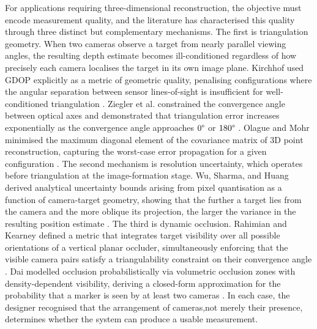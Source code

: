 For applications requiring three-dimensional reconstruction, the objective must encode measurement quality, and the literature has characterised this quality through three distinct but complementary mechanisms. The first is triangulation geometry. When two cameras observe a target from nearly parallel viewing angles, the resulting depth estimate becomes ill-conditioned regardless of how precisely each camera localises the target in its own image plane. Kirchhof used \gls{GDOP} explicitly as a metric of geometric quality, penalising configurations where the angular separation between sensor lines-of-sight is insufficient for well-conditioned triangulation \parencite{kirchhofOptimalPlacementMultiple2013}. Ziegler et al. constrained the convergence angle between optical axes and demonstrated that triangulation error increases exponentially as the convergence angle approaches $0\degree$ or $180\degree$ \parencite{zieglerOptimalCameraPlacement2023}. Olague and Mohr minimised the maximum diagonal element of the covariance matrix of 3D point reconstruction, capturing the worst-case error propagation for a given configuration \parencite{olagueOptimalCameraPlacement2002}. The second mechanism is resolution uncertainty, which operates before triangulation at the image-formation stage. Wu, Sharma, and Huang derived analytical uncertainty bounds arising from pixel quantisation as a function of camera-target geometry, showing that the further a target lies from the camera and the more oblique its projection, the larger the variance in the resulting position estimate \parencite{sharmaAnalysisUncertaintyBounds1998}. The third is dynamic occlusion. Rahimian and Kearney defined a metric that integrates target visibility over all possible orientations of a vertical planar occluder, simultaneously enforcing that the visible camera pairs satisfy a triangulability constraint on their convergence angle \parencite{rahimianOptimalCameraPlacement2017}. Dai modelled occlusion probabilistically via volumetric occlusion zones with density-dependent visibility, deriving a closed-form approximation for the probability that a marker is seen by at least two cameras \parencite{daiOptimalCameraConfiguration}. In each case, the designer recognised that the arrangement of cameras,not merely their presence, determines whether the system can produce a usable measurement.


